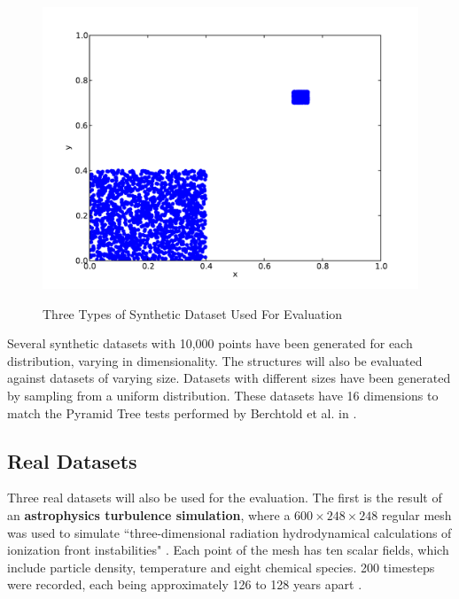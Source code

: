 \begin{figure}
\begin{center}
		\begin{subfloat} {%
			\includegraphics[scale=0.25]{figures/clustered_distribution.pdf}
		}
		\end{subfloat}
	\end{center}

	\caption{Three Types of Synthetic Dataset Used For Evaluation}
	\label{fig:synthetic-data}
\end{figure}

Several synthetic datasets with 10,000 points have been generated for each distribution, varying in dimensionality. The structures will also be evaluated against datasets of varying size. Datasets with different sizes have been generated by sampling from a uniform distribution. These datasets have 16 dimensions to match the Pyramid Tree tests performed by Berchtold et al. in \cite{pyramid-tree}.

\subsection{Real Datasets}

Three real datasets will also be used for the evaluation. The first is the result of an \textbf{astrophysics turbulence simulation}, where a $600 \times 248 \times 248$ regular mesh was used to simulate ``three-dimensional radiation hydrodynamical calculations of ionization front instabilities" \cite{astrophysics-dataset}.  Each point of the mesh has ten scalar fields, which include particle density, temperature and eight chemical species. 200 timesteps were recorded, each being approximately 126 to 128 years apart \cite{astrophysics-dataset}.


